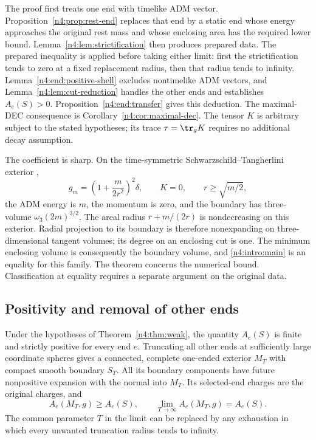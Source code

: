 The proof first treats one end with timelike ADM vector.
Proposition~\ref{n4:prop:rest-end} replaces that end by a static end
whose energy approaches the original rest mass and whose enclosing
area has the required lower bound. Lemma~\ref{n4:lem:strictification}
then produces prepared data. The prepared inequality is applied before
taking either limit: first the strictification tends to zero at a fixed
replacement radius, then that radius tends to infinity.
Lemma~\ref{n4:end:positive-shell} excludes nontimelike ADM vectors,
and Lemma~\ref{n4:lem:cut-reduction} handles the other ends and establishes
\(A_e(S)>0\). Proposition~\ref{n4:end:transfer} gives this deduction.
The maximal-DEC consequence is Corollary~\ref{n4:cor:maximal-dec}.
The tensor \(K\) is arbitrary subject to the stated hypotheses;
its trace \(\tau=\tr_gK\) requires no additional decay assumption.

The coefficient is sharp. On the time-symmetric
Schwarzschild--Tangherlini exterior \cite{Tangherlini1963},
\[
 g_m=\left(1+\frac{m}{2r^2}\right)^2\delta,\qquad
 K=0,\qquad r\ge\sqrt{m/2},
\]
the ADM energy is \(m\), the momentum is zero, and the boundary
has three-volume \(\omega_3(2m)^{3/2}\).
The areal radius \(r+m/(2r)\) is nondecreasing on this exterior.
Radial projection to its boundary is therefore nonexpanding on
three-dimensional tangent volumes; its degree on an enclosing cut is one.
The minimum enclosing volume is consequently the boundary volume,
and \eqref{n4:intro:main} is an equality for this family.
The theorem concerns the numerical bound. Classification at equality
requires a separate argument on the original data.

\subsection{Positivity and removal of other ends}

\begin{lemma}\label{n4:lem:cut-reduction}
Under the hypotheses of Theorem~\ref{n4:thm:weak}, the quantity \(A_e(S)\)
is finite and strictly positive for every end \(e\).
Truncating all other ends at sufficiently large coordinate spheres gives
a connected, complete one-ended exterior \(M_T\) with compact smooth
boundary \(S_T\). All its boundary components have future nonpositive
expansion with the normal into \(M_T\). Its selected-end charges are the
original charges, and
\begin{equation}\label{n4:end:cut-truncation}
 A_e(M_T,g)\ge A_e(S),\qquad
 \lim_{T\to\infty}A_e(M_T,g)=A_e(S).
\end{equation}
The common parameter \(T\) in the limit can be replaced by any exhaustion
in which every unwanted truncation radius tends to infinity.
\end{lemma}

